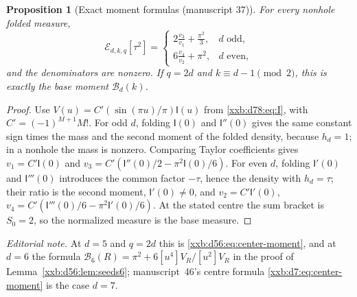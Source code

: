 \documentclass[11pt,a4paper]{article}
\numberwithin{equation}{section}
\newtheorem{proposition}[theorem]{Proposition}
\theoremstyle{definition}
\theoremstyle{remark}
\theoremstyle{plain}
\begin{document}
\begin{proposition}[Exact moment formulas (manuscript 37)]\label{xxb:d78:prop:exactmoments}
For every nonhole folded measure,
\begin{equation}\label{xxb:d78:eq:exactmoments}
 \mathcal E_{d,k,q}[\tau^2]=
 \begin{cases}
 \displaystyle 2\frac{v_3}{v_1}+\frac{\pi^2}{3},&d\text{ odd},\\[6pt]
 \displaystyle 6\frac{v_4}{v_2}+\pi^2,&d\text{ even},
 \end{cases}
\end{equation}
and the denominators are nonzero.  If $q=2d$ and $k\equiv d-1\pmod2$, this is
exactly the base moment $\mathcal B_d(k)$.
\end{proposition}
\begin{proof}
Use $V(u)=C'(\sin(\pi u)/\pi)\mathsf I(u)$ from \eqref{xxb:d78:eq:I}, with
$C'=(-1)^{M+1}M!$.  For odd $d$, folding $\mathsf I(0)$ and $\mathsf I''(0)$
gives the same constant sign times the mass and the second moment of the
folded density, because $h_d=1$; in a nonhole the mass is nonzero.  Comparing
Taylor coefficients gives $v_1=C'\mathsf I(0)$ and
$v_3=C'(\mathsf I''(0)/2-\pi^2\mathsf I(0)/6)$.  For even $d$, folding
$\mathsf I'(0)$ and $\mathsf I'''(0)$ introduces the common factor $-\tau$,
hence the density with $h_d=\tau$; their ratio is the second moment,
$\mathsf I'(0)\ne0$, and $v_2=C'\mathsf I'(0)$,
$v_4=C'(\mathsf I'''(0)/6-\pi^2\mathsf I'(0)/6)$.  At the stated centre the sum
bracket is $S_0=2$, so the normalized measure is the base measure.
\end{proof}
\emph{Editorial note.}  At $d=5$ and $q=2d$ this is
\eqref{xxb:d56:eq:center-moment}, and at $d=6$ the formula
$\mathcal B_6(R)=\pi^2+6[u^4]V_R/[u^2]V_R$ in the proof of
Lemma~\ref{xxb:d56:lem:seeds6}; manuscript~46's centre formula
\eqref{xxb:d7:eq:center-moment} is the case $d=7$.
\end{document}

